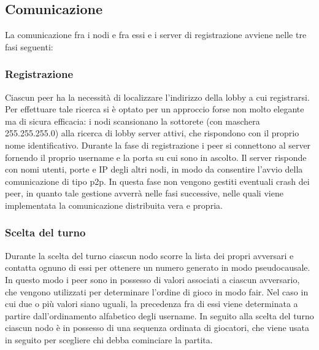 \subsection{Comunicazione}
La comunicazione fra i nodi e fra essi e i server di registrazione avviene nelle tre fasi seguenti:

\subsubsection{Registrazione}
Ciascun peer ha la necessità di localizzare l'indirizzo della lobby a cui 
registrarsi. Per effettuare tale ricerca si è optato per un approccio forse non 
molto elegante ma di sicura efficacia: i nodi scansionano la sottorete (con 
maschera 255.255.255.0) alla ricerca di lobby server attivi, che rispondono con 
il proprio nome identificativo.
Durante la fase di registrazione i peer si connettono al 
server fornendo il proprio username e la porta su cui sono in ascolto. Il 
server risponde con nomi utenti, porte e IP degli altri nodi, in modo da 
consentire l'avvio della comunicazione di tipo p2p. In questa fase non vengono 
gestiti eventuali crash dei peer, in quanto tale gestione avverrà nelle fasi 
successive, nelle quali viene implementata la comunicazione distribuita vera e 
propria.
\subsubsection{Scelta del turno}
Durante la scelta del turno ciascun nodo scorre la lista dei propri 
avversari e contatta ognuno di essi per ottenere un numero generato in modo 
pseudocausale. In questo modo i peer sono in possesso di valori associati a 
ciascun avversario, che vengono utilizzati per determinare l'ordine di gioco in 
modo fair. Nel caso in cui due o più valori siano uguali, la precedenza fra di essi 
viene determinata a partire dall'ordinamento alfabetico degli username. In 
seguito alla scelta del turno ciascun nodo è in possesso di una sequenza 
ordinata di giocatori, che viene usata in seguito per scegliere chi debba 
cominciare la partita.
